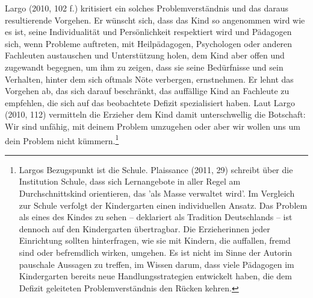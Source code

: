 Largo (2010, 102 f.) kritisiert ein solches Problemverständnis und das daraus resultierende Vorgehen. Er wünscht sich, dass das Kind so angenommen wird wie es ist, seine Individualität und Persönlichkeit respektiert wird und Pädagogen sich, wenn Probleme auftreten, mit Heilpädagogen, Psychologen oder anderen Fachleuten austauschen und Unterstützung holen, dem Kind aber offen und zugewandt begegnen, um ihm zu zeigen, dass sie seine Bedürfnisse und sein Verhalten, hinter dem sich oftmals Nöte verbergen, ernstnehmen. Er lehnt das Vorgehen ab, das sich darauf beschränkt, das auffällige Kind an Fachleute zu empfehlen, die sich auf das beobachtete Defizit spezialisiert haben. Laut Largo (2010, 112) vermitteln die Erzieher dem Kind damit unterschwellig die Botschaft: Wir sind unfähig, mit deinem Problem umzugehen oder aber wir wollen uns um dein Problem nicht kümmern.\footnote{Largos Bezugspunkt ist die Schule. Plaissance (2011, 29) schreibt über die Institution Schule, dass sich Lernangebote in aller Regel am Durchschnittskind orientieren, das 'als Masse verwaltet wird'. Im Vergleich zur Schule verfolgt der Kindergarten einen individuellen Ansatz. Das Problem als eines des Kindes zu sehen -- deklariert als Tradition Deutschlands -- ist dennoch auf den Kindergarten übertragbar. Die Erzieherinnen jeder Einrichtung sollten hinterfragen, wie sie mit Kindern, die auffallen, fremd sind oder befremdlich wirken, umgehen. Es ist nicht im Sinne der Autorin pauschale Aussagen zu treffen, im Wissen darum, dass viele Pädagogen im Kindergarten bereits neue Handlungsstrategien entwickelt haben, die dem Defizit geleiteten Problemverständnis den Rücken kehren.} 

